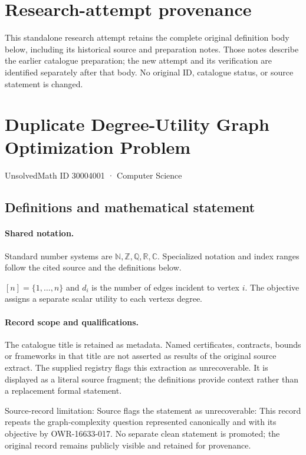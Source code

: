 \documentclass[11pt]{article}
\begin{document}
\section*{Research-attempt provenance}
This standalone research attempt retains the complete original definition body below,
including its historical source and preparation notes. Those notes describe the
earlier catalogue preparation; the new attempt and its verification are identified
separately after that body. No original ID, catalogue status, or source statement is changed.

\section{Duplicate Degree-Utility Graph Optimization Problem}\label{30004001}
{\small UnsolvedMath ID 30004001 · Computer Science}
\subsection{Definitions and mathematical statement}

\paragraph{Shared notation.}Standard number systems are $\mathbb N,\mathbb Z,\mathbb Q,\mathbb R,\mathbb C$. Specialized notation and index ranges follow the cited source and the definitions below.


$[n]=\{1,\ldots,n\}$ and $d_i$ is the number of edges incident to vertex $i$. The objective assigns a separate scalar utility to each vertex\textquotesingle s degree.
\paragraph{Record scope and qualifications.}
The catalogue title is retained as metadata. Named certificates, contracts, bounds or frameworks in that title are not asserted as results of the original source extract.
The supplied registry flags this extraction as unrecoverable. It is displayed as a literal source fragment; the definitions provide context rather than a replacement formal statement.

Source-record limitation: Source flags the statement as unrecoverable: This record repeats the graph-complexity question represented canonically and with its objective by OWR-16633-017. No separate clean statement is promoted; the original record remains publicly visible and retained for provenance.
\end{document}
